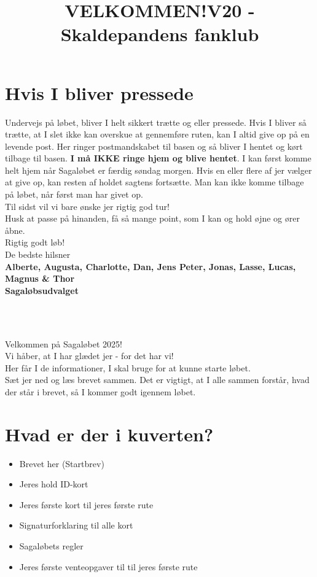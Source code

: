 \section{Hvis I bliver pressede}
Undervejs på løbet, bliver I helt sikkert trætte og eller pressede. Hvis I bliver så trætte, at I slet ikke kan overskue at gennemføre ruten, kan I altid give op på en levende post. Her ringer postmandskabet til basen og så bliver I hentet og kørt tilbage til basen. \textbf{I må IKKE ringe hjem og blive hentet}. I kan først komme helt hjem når Sagaløbet er færdig søndag morgen. Hvis en eller flere af jer vælger at give op, kan resten af holdet sagtens fortsætte. Man kan ikke komme tilbage på løbet, når først man har givet op.\\
\newline
Til sidst vil vi bare ønske jer rigtig god tur!\\
Husk at passe på hinanden, få så mange point, som I kan og hold øjne og ører åbne.\\
\newline
Rigtig godt løb!\\
\newline
\textcolor{søblå}{De bedste hilsner}\\
\textcolor{natblå}{\textbf{Alberte, Augusta, Charlotte, Dan, Jens Peter, Jonas, Lasse, Lucas, Magnus \& Thor}}\\
\textcolor{natblå}{\textbf{Sagaløbsudvalget}}\\
\newpage
\title{VELKOMMEN!}\\
\newline
\title{\textcolor{søblå}{V20 - Skaldepandens fanklub }}\\
\newline
Velkommen på Sagaløbet 2025!\\
Vi håber, at I har glædet jer - for det har vi!\\
Her får I de informationer, I skal bruge for at kunne starte løbet.\\
Sæt jer ned og læs brevet sammen. Det er vigtigt, at I alle sammen forstår, hvad der står i brevet, så I kommer godt igennem løbet.
\section{Hvad er der i kuverten?}
\begin{itemize}
    \item Brevet her (Startbrev)
    \item Jeres hold ID-kort
    \item Jeres første kort til jeres første rute
    \item Signaturforklaring til alle kort
    \item Sagaløbets regler
    \item Jeres første venteopgaver til til jeres første rute
\end{itemize}
